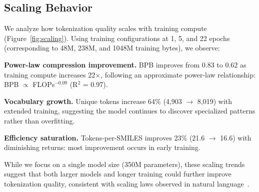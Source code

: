 
\subsection{Scaling Behavior}

We analyze how tokenization quality scales with training compute (Figure~\ref{fig:scaling}). Using training configurations at 1, 5, and 22 epochs (corresponding to 48M, 238M, and 1048M training bytes), we observe:

\textbf{Power-law compression improvement.} BPB improves from 0.83 to 0.62 as training compute increases 22$\times$, following an approximate power-law relationship: BPB $\propto$ FLOPs$^{-0.09}$ (R$^2$ = 0.97).

\textbf{Vocabulary growth.} Unique tokens increase 64\% (4,903 $\rightarrow$ 8,019) with extended training, suggesting the model continues to discover specialized patterns rather than overfitting.

\textbf{Efficiency saturation.} Tokens-per-SMILES improves 23\% (21.6 $\rightarrow$ 16.6) with diminishing returns: most improvement occurs in early training.

While we focus on a single model size (350M parameters), these scaling trends suggest that both larger models and longer training could further improve tokenization quality, consistent with scaling laws observed in natural language~\citep{kaplan2020scaling}.
